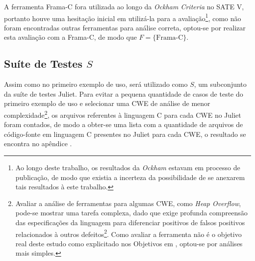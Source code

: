 A ferramenta Frama-C fora utilizada ao longo da \textit{Ockham Criteria} no SATE V, portanto houve uma hesitação inicial em utilizá-la para a avaliação\footnote{Ao longo deste trabalho, os resultados da \textit{Ockham} estavam em processo de publicação, de modo que existia a incerteza da possibilidade de se anexarem tais resultados à este trabalho.}, como não foram encontradas outras ferramentas para análise correta, optou-se por realizar esta avaliação com a Frama-C, de modo que
$F = \{\mbox{Frama-C}\}$.

\subsection{Suíte de Testes $S$}

Assim como no primeiro exemplo de uso, será utilizado como $S$, um subconjunto da suíte de testes Juliet. Para evitar a pequena quantidade de casos de teste do primeiro exemplo de uso e selecionar uma CWE de análise de menor complexidade\footnote{Avaliar a análise de ferramentas para algumas CWE, como \textit{Heap Overflow}, pode-se mostrar uma tarefa complexa, dado que exige profunda compreensão das especificações da linguagem para diferenciar positivos de falsos positivos relacionados à outros defeitos\footnote{Embora o Juliet apresente apenas 1 defeito por caso de teste, uma ferramenta pode apontar, por exemplo, um defeito relacionado à outra classe de fraquezas no mesmo ponto de entrada do defeito apresentado em um caso de testes, não gerando um positivo para o defeito relevante à análise}. Como avaliar a ferramenta não é o objetivo real deste estudo como explicitado nos Objetivos em , optou-se por análises mais simples.}, os arquivos referentes à linguagem C para cada CWE no Juliet foram contados, de modo a obter-se uma lista com a quantidade de arquivos de código-fonte em linguagem C presentes no Juliet para cada CWE, o resultado se encontra no apêndice .

